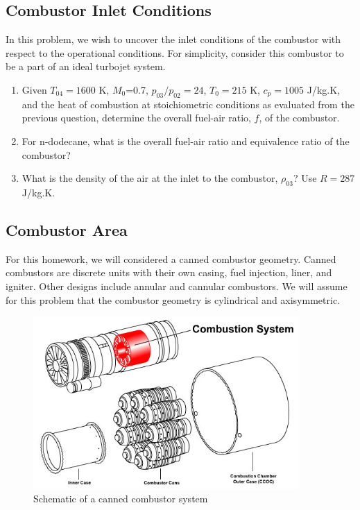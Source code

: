 \documentclass[11pt]{article}
\begin{document}
\subsection{Combustor Inlet Conditions}
In this problem, we wish to uncover the inlet conditions of the combustor with respect to the operational conditions. For simplicity, consider this combustor to be a part of an ideal turbojet system. 
\begin{enumerate}
	\item
    	Given $T_{04}=1600$ K, $M_0$=0.7, $p_{03}/p_{02}=24$,  $T_0=215$ K, $c_p=1005$ J/kg.K, and the heat of combustion at stoichiometric conditions as evaluated from the previous question, determine the overall fuel-air ratio, $f$, of the combustor.
    \item
    	For n-dodecane, what is the overall fuel-air ratio and equivalence ratio of the combustor? 
    \item
    	What is the density of the air at the inlet to the combustor, $\rho_{03}$? Use $R=287$ J/kg.K.
\end{enumerate}
\subsection{Combustor Area}
For this homework, we will considered a canned combustor geometry. Canned combustors are discrete units with their own casing, fuel injection, liner, and igniter. Other designs include annular and cannular combustors. We will assume for this problem that the combustor geometry is cylindrical and axisymmetric. 

\begin{figure}[!ht!]
	\begin{center}
		\includegraphics[width=0.9\textwidth]{cannedCombustor.jpg}
		\caption{\label{FIG_CC} Schematic of a canned combustor system}
	\end{center}
\end{figure}
\end{document}
